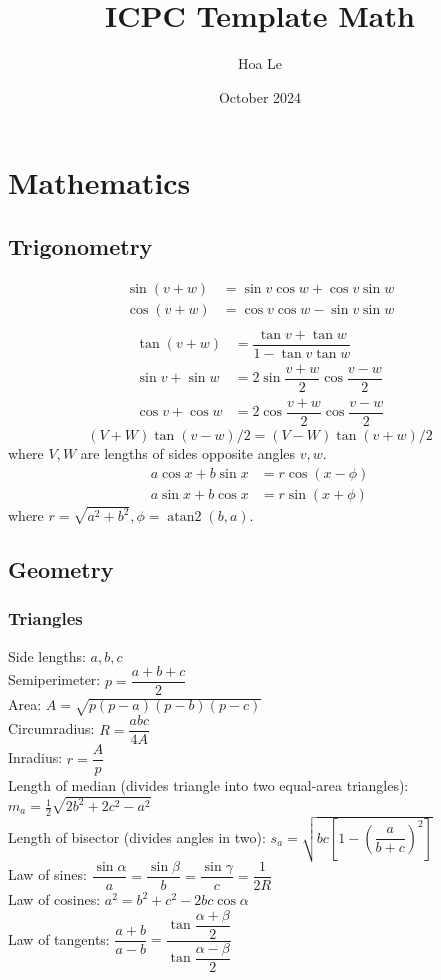 \documentclass{article}
\title{ICPC Template Math}
\author{Hoa Le}
\date{October 2024}
\begin{document}

\chapter{Mathematics}

\section{Trigonometry}
\begin{align*}
\sin(v+w)&{}=\sin v\cos w+\cos v\sin w\\
\cos(v+w)&{}=\cos v\cos w-\sin v\sin w\\
\end{align*}
\begin{align*}
\tan(v+w)&{}=\dfrac{\tan v+\tan w}{1-\tan v\tan w}\\
\sin v+\sin w&{}=2\sin\dfrac{v+w}{2}\cos\dfrac{v-w}{2}\\
\cos v+\cos w&{}=2\cos\dfrac{v+w}{2}\cos\dfrac{v-w}{2}
\end{align*}
\[ (V+W)\tan(v-w)/2{}=(V-W)\tan(v+w)/2 \]
where $V, W$ are lengths of sides opposite angles $v, w$.
\begin{align*}
	a\cos x+b\sin x&=r\cos(x-\phi)\\
	a\sin x+b\cos x&=r\sin(x+\phi)
\end{align*}
where $r=\sqrt{a^2+b^2}, \phi=\operatorname{atan2}(b,a)$.

\section{Geometry}

\subsection{Triangles}
Side lengths: $a,b,c$\\
Semiperimeter: $p=\dfrac{a+b+c}{2}$\\
Area: $A=\sqrt{p(p-a)(p-b)(p-c)}$\\
Circumradius: $R=\dfrac{abc}{4A}$\\
Inradius: $r=\dfrac{A}{p}$\\
Length of median (divides triangle into two equal-area triangles): $m_a=\tfrac{1}{2}\sqrt{2b^2+2c^2-a^2}$\\
Length of bisector (divides angles in two): $s_a=\sqrt{bc\left[1-\left(\dfrac{a}{b+c}\right)^2\right]}$\\
Law of sines: $\dfrac{\sin\alpha}{a}=\dfrac{\sin\beta}{b}=\dfrac{\sin\gamma}{c}=\dfrac{1}{2R}$\\
Law of cosines: $a^2=b^2+c^2-2bc\cos\alpha$\\
Law of tangents: $\dfrac{a+b}{a-b}=\dfrac{\tan\dfrac{\alpha+\beta}{2}}{\tan\dfrac{\alpha-\beta}{2}}$\\
\end{document}
